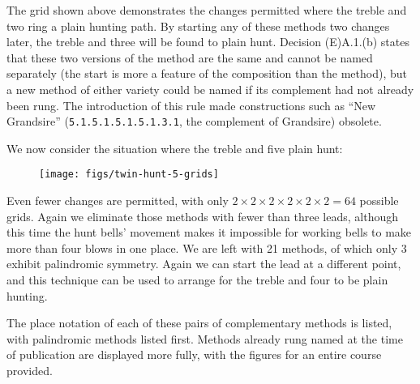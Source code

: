 The grid shown above demonstrates the changes permitted where the treble and two
ring a plain hunting path.
By starting any of these methods two changes later,
the treble and three will be found to plain hunt.
Decision (E)A.1.(b) states that these two versions of the method are the same
and cannot be named separately
(the start is more a feature of the composition than the method),
but a new method of either variety could be named if its complement had not
already been rung.
The introduction of this rule made constructions such as ``New Grandsire''
({\tt 5.1.5.1.5.1.5.1.3.1}, the complement of Grandsire) obsolete.

We now consider the situation where the treble and five plain hunt:

\begin{figure}[h]
  \centering
  \texttt{[image: figs/twin-hunt-5-grids]}
\end{figure}

Even fewer changes are permitted, with only
\(2 \times 2 \times 2 \times 2 \times 2 \times 2 = 64\) possible grids.
Again we eliminate those methods with fewer than three leads,
although this time the hunt bells’ movement makes it impossible for working
bells to make more than four blows in one place.
We are left with 21 methods, of which only 3 exhibit palindromic symmetry.
Again we can start the lead at a different point, and this technique can be used
to arrange for the treble and four to be plain hunting.

The place notation of each of these pairs of complementary methods is listed,
with palindromic methods listed first.
Methods already rung named at the time of publication are displayed more fully,
with the figures for an entire course provided.
